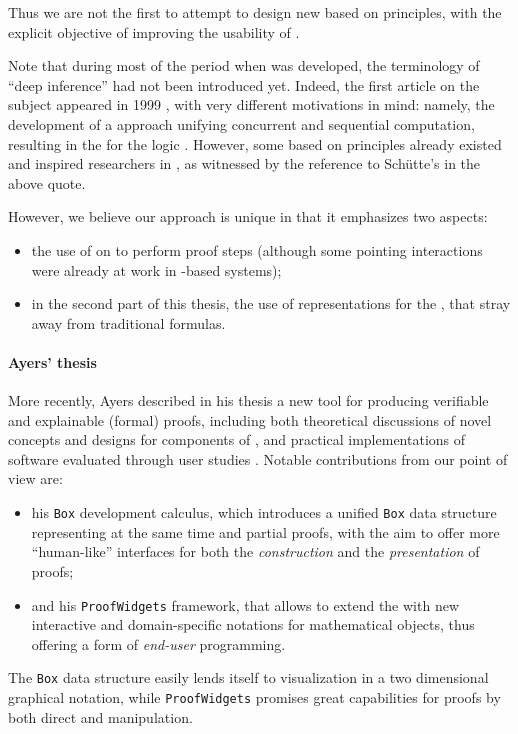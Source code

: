 Thus we are not the first to attempt to design new  based on  principles, with the explicit objective of improving the usability of
.
\begin{digression}
  \AP
  Note that during most of the period when  was developed,
the terminology of ``deep inference'' had not been introduced yet. Indeed, the
first article on the subject appeared in 1999 \cite{Guglielmi1999ACO}, with very
different motivations in mind: namely, the development of a
 approach unifying concurrent and sequential computation,
resulting in the  for the logic . However,
some  based on  principles already existed
and inspired researchers in , as witnessed by the reference
to Schütte's  in the above quote.
\end{digression}
However, we believe our approach is unique in that it emphasizes two aspects:
\begin{itemize}
  \item the use of \emph{} on  to perform
  proof steps (although some pointing interactions were already at work in
  -based systems);
  \item in the second part of this thesis, the use of \emph{}
  representations for the , that stray away from traditional
   formulas.
\end{itemize}

\paragraph{Ayers' thesis}

More recently, Ayers described in his thesis a new tool for producing verifiable
and explainable (formal) proofs, including both theoretical discussions of novel
concepts and designs for components of , and practical
implementations of software evaluated through user studies
. Notable contributions from our point of view are:
\begin{itemize}
  \item his \texttt{Box} development calculus, which introduces a unified
\texttt{Box} data structure representing at the same time  and partial
proofs, with the aim to offer more ``human-like'' interfaces for both the
\emph{construction} and the \emph{presentation} of proofs;
  \item and his \texttt{ProofWidgets} framework, that allows to extend the
  with new interactive and domain-specific
notations for mathematical objects, thus offering a form of \emph{end-user}
programming.
\end{itemize}
The \texttt{Box} data structure easily lends itself to visualization in a two
dimensional graphical notation, while \texttt{ProofWidgets} promises great
capabilities for proofs by both direct and  manipulation.

